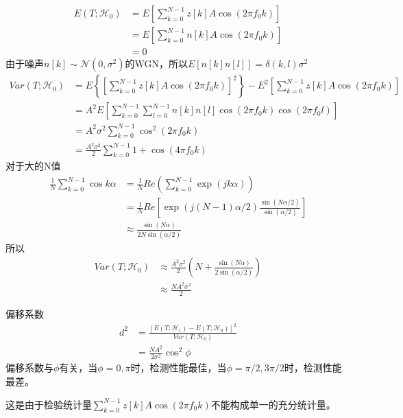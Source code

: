\documentclass[fontset=windows]{article}
\numberwithin{figure}{section}
\begin{document}
\begin{align*}
    E(T;\mathcal{H}_0)
     & =E\left[\sum_{k=0}^{N-1}z[k]A\cos (2\pi f_0 k)\right] \\
     & =E\left[\sum_{k=0}^{N-1}n[k]A\cos (2\pi f_0 k)\right] \\
     & =0
\end{align*}
由于噪声\(n[k]\sim\mathcal{N}(0,\sigma^2)\)的WGN，所以\(E\left[n[k]n[l]\right]=\delta(k,l)\sigma^2\)
\begin{align*}
    Var(T;\mathcal{H}_0)
     & =E\left\{\left[\sum_{k=0}^{N-1}z[k]A\cos (2\pi f_0 k)\right]^2 \right\}-E^2\left[\sum_{k=0}^{N-1}z[k]A\cos (2\pi f_0 k)\right] \\
     & =A^2E\left[\sum_{k=0}^{N-1}\sum_{l=0}^{N-1}n[k]n[l]\cos (2\pi f_0 k)\cos (2\pi f_0 l)\right]                                   \\
     & =A^2\sigma^2\sum_{k=0}^{N-1}\cos^2 (2\pi f_0 k)                                                                                \\
     & =\frac{A^2\sigma^2}{2}\sum_{k=0}^{N-1}1+\cos (4\pi f_0 k)
\end{align*}
对于大的N值
\begin{align*}
    \frac{1}{N}\sum_{k=0}^{N-1}\cos k\alpha
     & =\frac{1}{N}Re\left(\sum_{k=0}^{N-1}\exp(jk\alpha)\right)                             \\
     & =\frac{1}{N}Re\left[\exp(j(N-1)\alpha/2)\frac{\sin(N\alpha/2)}{\sin(\alpha/2)}\right] \\
     & \approx \frac{\sin(N\alpha)}{2N\sin(\alpha/2)}
\end{align*}
所以
\begin{align*}
    Var(T;\mathcal{H}_0)
     & \approx \frac{A^2\sigma^2}{2}(N+\frac{\sin(N\alpha)}{2\sin(\alpha/2)}) \\
     & \approx\frac{NA^2\sigma^2}{2}
\end{align*}

偏移系数
\begin{align*}
    d^2
     & =\frac{\left[E(T;\mathcal{H}_1)-E(T;\mathcal{H}_0)\right]^2}{Var(T;\mathcal{H}_0)} \\
     & =\frac{NA^2}{2\sigma^2}\cos^2 \phi
\end{align*}
偏移系数与\(\phi\)有关，当\(\phi=0,\pi\)时，检测性能最佳，当\(\phi=\pi/2,3\pi/2\)时，检测性能最差。

这是由于检验统计量\(\sum_{k=0}^{N-1}z[k]A\cos(2\pi f_0 k)\)不能构成单一的充分统计量。
\end{document}
